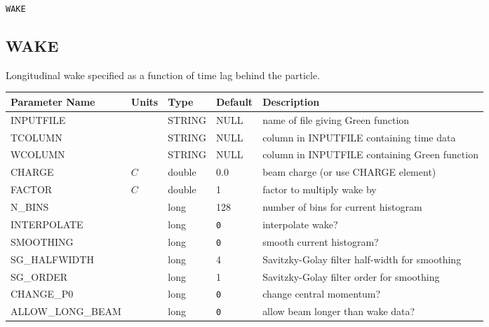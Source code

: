 \begin{latexonly}
\newpage
\begin{center}{\Large\verb|WAKE|}\end{center}
\end{latexonly}\subsection{WAKE}
Longitudinal wake specified as a function of time lag behind the particle.
\\
\begin{tabular}{|l|l|l|l|p{\descwidth}|} \hline
Parameter Name & Units & Type & Default & Description \\ \hline 
INPUTFILE &  & STRING &   NULL            & name of file giving Green function  \\ \hline 
TCOLUMN &  & STRING &   NULL            & column in INPUTFILE containing time data  \\ \hline 
WCOLUMN &  & STRING &   NULL            & column in INPUTFILE containing Green function  \\ \hline 
CHARGE & $C$ & double &  0.0 & beam charge (or use CHARGE element)  \\ \hline 
FACTOR & $C$ & double &   1 & factor to multiply wake by  \\ \hline 
N\_BINS &  & long &   128             & number of bins for current histogram  \\ \hline 
INTERPOLATE &  & long &  \verb|0| & interpolate wake?  \\ \hline 
SMOOTHING &  & long &  \verb|0| & smooth current histogram?  \\ \hline 
SG\_HALFWIDTH &  & long &   4               & Savitzky-Golay filter half-width for smoothing  \\ \hline 
SG\_ORDER &  & long &   1               & Savitzky-Golay filter order for smoothing  \\ \hline 
CHANGE\_P0 &  & long &  \verb|0| & change central momentum?  \\ \hline 
ALLOW\_LONG\_BEAM &  & long &  \verb|0| & allow beam longer than wake data?  \\ \hline 
\end{tabular}

